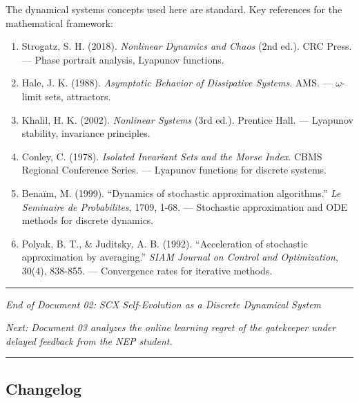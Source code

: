 \documentclass[
  12pt,
]{article}
\providecommand{\tightlist}{%
  \setlength{\itemsep}{0pt}\setlength{\parskip}{0pt}}
\begin{document}
The dynamical systems concepts used here are standard. Key references
for the mathematical framework:

\begin{enumerate}
\def\labelenumi{\arabic{enumi}.}
\tightlist
\item
  Strogatz, S. H. (2018). \emph{Nonlinear Dynamics and Chaos} (2nd ed.).
  CRC Press. --- Phase portrait analysis, Lyapunov functions.
\item
  Hale, J. K. (1988). \emph{Asymptotic Behavior of Dissipative Systems}.
  AMS. --- \(\omega\)-limit sets, attractors.
\item
  Khalil, H. K. (2002). \emph{Nonlinear Systems} (3rd ed.). Prentice
  Hall. --- Lyapunov stability, invariance principles.
\item
  Conley, C. (1978). \emph{Isolated Invariant Sets and the Morse Index}.
  CBMS Regional Conference Series. --- Lyapunov functions for discrete
  systems.
\item
  Benaïm, M. (1999). ``Dynamics of stochastic approximation
  algorithms.'' \emph{Le Seminaire de Probabilites}, 1709, 1-68. ---
  Stochastic approximation and ODE methods for discrete dynamics.
\item
  Polyak, B. T., \& Juditsky, A. B. (1992). ``Acceleration of stochastic
  approximation by averaging.'' \emph{SIAM Journal on Control and
  Optimization}, 30(4), 838-855. --- Convergence rates for iterative
  methods.
\end{enumerate}

\begin{center}\rule{0.5\linewidth}{0.5pt}\end{center}

\emph{End of Document 02: SCX Self-Evolution as a Discrete Dynamical
System}

\emph{Next: Document 03 analyzes the online learning regret of the
gatekeeper under delayed feedback from the NEP student.}

\begin{center}\rule{0.5\linewidth}{0.5pt}\end{center}

\subsection{Changelog}\label{changelog}
\end{document}
